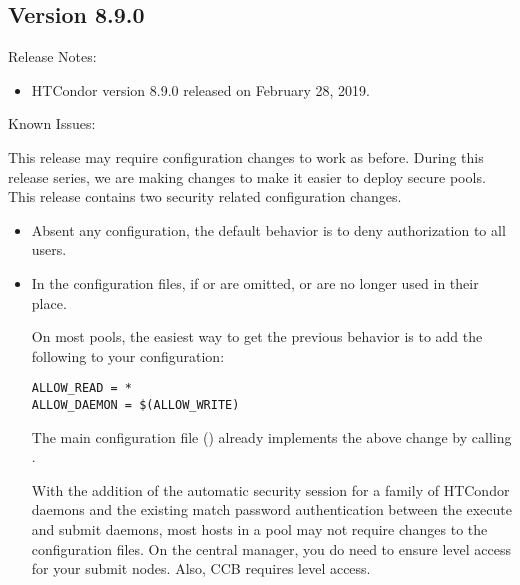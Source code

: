 \subsection*{\label{sec:New-8-9-0}Version 8.9.0}

\noindent Release Notes:

\begin{itemize}

\item HTCondor version 8.9.0 released on February 28, 2019.

\end{itemize}

\noindent Known Issues:

This release may require configuration changes to work as before.
During this release series, we are making changes to make it easier to deploy
secure pools. This release contains two security related configuration changes.

\begin{itemize}

\item Absent any configuration, the default behavior is to deny authorization
to all users.

\item In the configuration files, if  or
 are omitted,  or
 are no longer used in their place.

On most pools, the easiest way to get the previous behavior is to add the
following to your configuration:

\begin{verbatim}
ALLOW_READ = *
ALLOW_DAEMON = $(ALLOW_WRITE)
\end{verbatim}

The main configuration file () already
implements the above change by calling .

With the addition of the automatic security session for a family of HTCondor
daemons and the existing match password authentication between the execute
and submit daemons, most hosts in a pool may not require changes to the
configuration files.
On the central manager, you do need to ensure  level access
for your submit nodes.
Also, CCB requires  level access.

\end{itemize}

